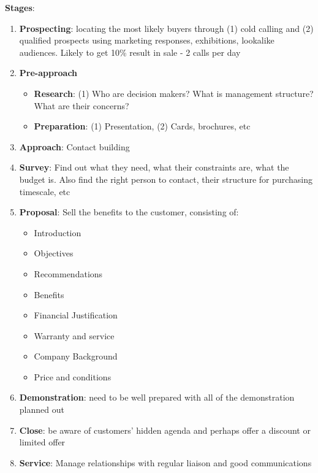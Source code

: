 \documentclass{article}
\begin{document}
\begin{multicols}{2}
\textbf{Stages}:
\begin{enumerate}
    \item \textbf{Prospecting}: locating the most likely buyers through (1) cold calling and (2) qualified prospects using marketing responses, exhibitions, lookalike audiences. Likely to get 10\% result in sale - 2 calls per day
    \item \textbf{Pre-approach}
    \begin{itemize}
        \item \textbf{Research}: (1) Who are decision makers? What is management structure? What are their concerns?
        \item \textbf{Preparation}: (1) Presentation, (2) Cards, brochures, etc
    \end{itemize}
    \item \textbf{Approach}: Contact building
    \item \textbf{Survey}: Find out what they need, what their constraints are, what the budget is. Also find the right person to contact, their structure for purchasing timescale, etc
    \item \textbf{Proposal}: Sell the benefits to the customer, consisting of:
    \begin{itemize}
        \item Introduction
        \item Objectives
        \item Recommendations
        \item Benefits
        \item Financial Justification
        \item Warranty and service
        \item Company Background
        \item Price and conditions
    \end{itemize}
    \item \textbf{Demonstration}: need to be well prepared with all of the demonstration planned out
    \item \textbf{Close}: be aware of customers' hidden agenda and perhaps offer a discount or limited offer
    \item \textbf{Service}: Manage relationships with regular liaison and good communications
\end{enumerate}


\end{multicols}
\end{document}
